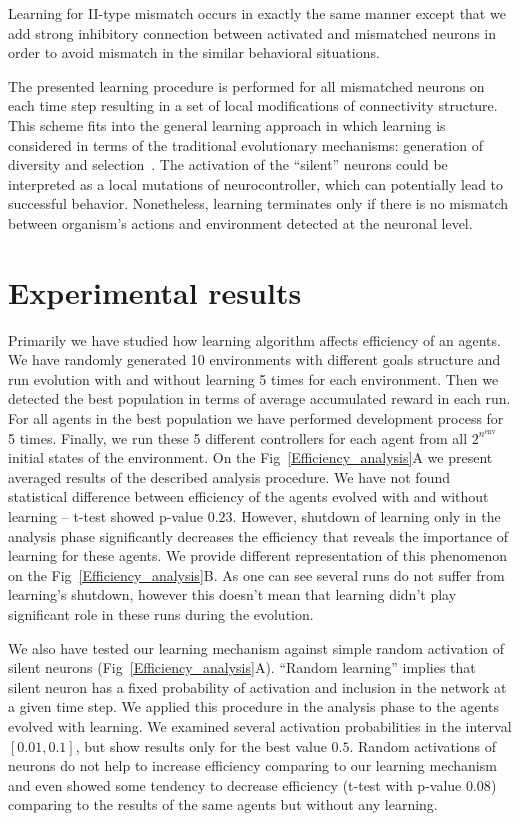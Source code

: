 \documentclass[letterpaper]{article}
\begin{document}
Learning for II-type mismatch occurs in exactly the same manner except that we add strong inhibitory connection between activated and mismatched neurons in order to avoid mismatch in the similar behavioral situations.   

The presented learning procedure is performed for all mismatched neurons on each time step resulting in a set of local modifications of connectivity structure. This scheme fits into the general learning approach in which learning is considered in terms of the traditional evolutionary mechanisms: generation of diversity and selection~\citep{Burtsev2008}. The activation of the ``silent'' neurons could be interpreted as a local mutations of neurocontroller, which can potentially lead to successful behavior. Nonetheless, learning terminates only if there is no mismatch between organism's actions and environment detected at the neuronal level.      

\section{Experimental results}

Primarily we have studied how learning algorithm affects efficiency of an agents. We have randomly generated 10 environments with different goals structure and run evolution with and without learning 5 times for each environment. Then we detected the best population in terms of average accumulated reward in each run. For all agents in the best population we have performed development process for 5 times. Finally, we run these 5 different controllers for each agent from all $2^{n^{\mathrm{env}}}$ initial states of the environment. On the Fig~\ref{Efficiency_analysis}A we present averaged results of the described analysis procedure. We have not found statistical difference between efficiency of the agents evolved with and without learning -- t-test showed p-value $0.23$. However, shutdown of learning only in the analysis phase significantly decreases the efficiency that reveals the importance of learning for these agents. We provide different representation of this phenomenon on the Fig~\ref{Efficiency_analysis}B. As one can see several runs do not suffer from learning's shutdown, however this doesn't mean that learning didn't play significant role in these runs during the evolution. 

We also have tested our learning mechanism against simple random activation of silent neurons (Fig~\ref{Efficiency_analysis}A). ``Random learning'' implies that silent neuron has a fixed probability of activation and inclusion in the network at a given time step. We applied this procedure in the analysis phase to the agents evolved with learning. We examined several activation probabilities in the interval $\left[0.01,0.1\right]$, but show results only for the best value $0.5$. Random activations of neurons do not help to increase efficiency comparing to our learning mechanism and even showed some tendency to decrease efficiency (t-test with p-value $0.08$) comparing to the results of the same agents but without any learning.
\end{document}
